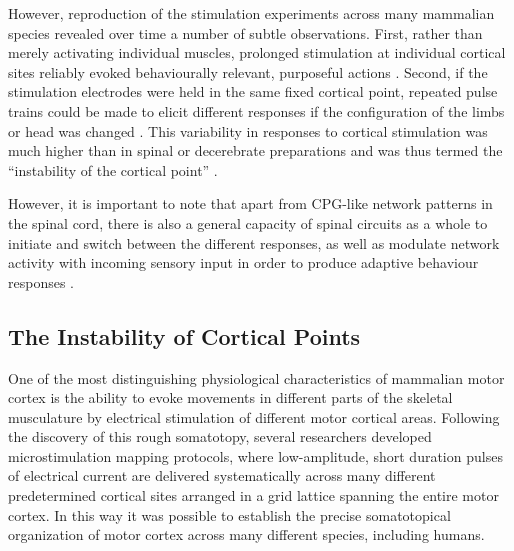 

However, reproduction of the stimulation experiments across many mammalian species \cite{Ferrier1873,Clark1937} revealed over time a number of subtle observations. First, rather than merely activating individual muscles, prolonged stimulation at individual cortical sites reliably evoked behaviourally relevant, purposeful actions \cite{Ferrier1873,Clark1937}. Second, if the stimulation electrodes were held in the same fixed cortical point, repeated pulse trains could be made to elicit different responses if the configuration of the limbs or head was changed \cite{Ward1938}. This variability in responses to cortical stimulation was much higher than in spinal or decerebrate preparations and was thus termed the ``instability of the cortical point'' \cite{GrahamBrown1912,Leyton1917}.

However, it is important to note that apart from CPG-like network patterns in the spinal cord, there is also a general capacity of spinal circuits as a whole to initiate and switch between the different responses, as well as modulate network activity with incoming sensory input in order to produce adaptive behaviour responses \cite{Forssberg1975}.

\subsection{The Instability of Cortical Points}

One of the most distinguishing physiological characteristics of mammalian motor cortex is the ability to evoke movements in different parts of the skeletal musculature by electrical stimulation of different motor cortical areas. Following the discovery of this rough somatotopy, several researchers developed microstimulation mapping protocols, where low-amplitude, short duration pulses of electrical current are delivered systematically across many different predetermined cortical sites arranged in a grid lattice spanning the entire motor cortex. In this way it was possible to establish the precise somatotopical organization of motor cortex across many different species, including humans.

